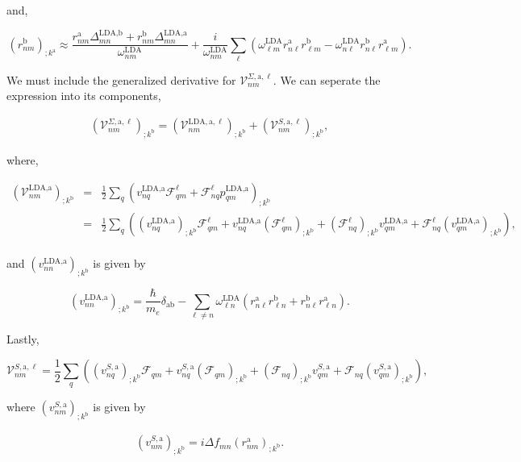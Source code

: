 \documentclass[11pt]{article}
\begin{document}
and,

\begin{equation}\label{eli.2}
(r^{\text{b}}_{nm})_{;k^{\text{a}}} \approx \frac{r^{\text{a}}_{nm}\Delta^{\text{LDA},\text{b}}_{mn} + r^{\text{b}}_{nm}\Delta^{\text{LDA},\text{a}}_{mn}}{\omega^\text{LDA}_{nm}} + \frac{i}{\omega^\text{LDA}_{nm}}\sum_{\ell}\left(\omega^\text{LDA}_{\ell m}r^{\text{a}}_{n\ell}r^{\text{b}}_{\ell m} - \omega^\text{LDA}_{n\ell}r^{\text{b}}_{n\ell}r^{\text{a}}_{\ell m}\right).
\end{equation}

We must include the generalized derivative for $\mathcal{V}^{\Sigma,\text{a},\ell}_{nm}$. We can seperate the expression into its components,

\begin{eqnarray}\label{a.1}
\left(\mathcal{V}^{\Sigma,\text{a},\ell}_{nm}\right)_{;k^\text{b}} = \left(\mathcal{V}^{\text{LDA},\text{a},\ell}_{nm}\right)_{;k^\text{b}} + \left(\mathcal{V}^{S,\text{a},\ell}_{nm}\right)_{;k^\text{b}},
\end{eqnarray}

where, %

\begin{eqnarray}\label{a.2}
\left(\mathcal{V}^{\text{LDA},\text{a}}_{nm}\right)_{;k^\text{b}} &=&
\frac{1}{2}\sum_q\left(v^{\text{LDA},\text{a}}_{nq}\mathcal{F}^\ell_{qm}+\mathcal{F}^\ell_{nq} p^{\text{LDA},\text{a}}_{qm}\right) _{;k^\text{b}}\nonumber\\
&=& \frac{1}{2}\sum_q\left((v^{\text{LDA},\text{a}}_{nq})_{;k^\text{b}}\mathcal{F}^\ell_{qm} + v^{\text{LDA},\text{a}}_{nq}(\mathcal{F}^\ell_{qm})_{;k^\text{b}} + (\mathcal{F}^\ell_{nq})_{;k^\text{b}} v^{\text{LDA},\text{a}}_{qm} + \mathcal{F}^\ell_{nq} (v^{\text{LDA},\text{a}}_{qm})_{;k^\text{b}}\right),\\
\end{eqnarray} 

and $\left(v^{\text{LDA},\text{a}}_{nn}\right)_{;k^\text{b}}$ is given by

\begin{equation}
\left(v^{\text{LDA},\text{a}}_{nn}\right)_{;k^\text{b}} = \frac{\hbar}{m_e}\delta_{\text{a}\text{b}} - \sum_{\ell\ne n}\omega^\text{LDA}_{\ell n}\left(r^{\text{a}}_{n\ell}r^\text{b}_{\ell n} + r^\text{b}_{n\ell}r^{\text{a}}_{\ell n}\right).
\end{equation}

Lastly,

\begin{equation}\label{a.3b}
\mathcal{V}^{S,\text{a},\ell}_{nm} = \frac{1}{2}\sum_{q}\left((v^{S,\text{a}}_{nq})_{;k^\text{b}}\mathcal{F}_{qm} + v^{S,\text{a}}_{nq}(\mathcal{F}_{qm})_{;k^\text{b}} + (\mathcal{F}_{nq})_{;k^\text{b}}v_{qm}^{S,\text{a}} + \mathcal{F}_{nq} (v_{qm}^{S,\text{a}})_{;k^\text{b}}\right),
\end{equation}

where $(v^{S,\text{a}}_{nm})_{;k^\text{b}}$ is given by

\begin{eqnarray}\label{choni.1}
(v^{S,\text{a}}_{nm})_{;k^\text{b}}=i\Delta f_{mn}(r^\text{a}_{nm})_{;k^\text{b}}.
\end{eqnarray}
\end{document}
